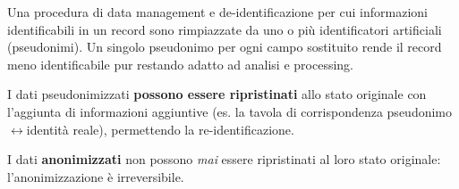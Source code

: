 \documentclass[a4paper,11pt]{article}
\begin{document}
\begin{definizione}[Pseudoanonimizzazione]
Una procedura di data management e de-identificazione per cui informazioni identificabili in un record sono rimpiazzate da uno o pi\`{u} identificatori artificiali (pseudonimi). Un singolo pseudonimo per ogni campo sostituito rende il record meno identificabile pur restando adatto ad analisi e processing.

I dati pseudonimizzati \textbf{possono essere ripristinati} allo stato originale con l'aggiunta di informazioni aggiuntive (es. la tavola di corrispondenza pseudonimo$\leftrightarrow$identit\`{a} reale), permettendo la re-identificazione.

I dati \textbf{anonimizzati} non possono \emph{mai} essere ripristinati al loro stato originale: l'anonimizzazione \`{e} irreversibile.
\end{definizione}
\end{document}
